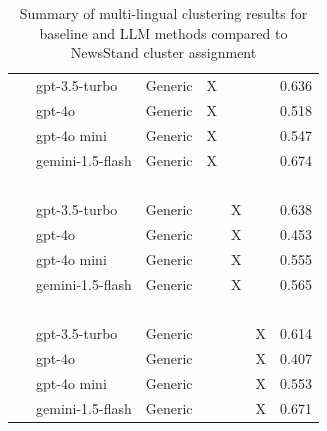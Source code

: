 \begin{table}[ht!]
\begin{tabular}{l|l|cccc|r}
        ~                     & gpt-3.5-turbo     & Generic               & X              & ~                  & ~                    & 0.636 \\
        ~                     & gpt-4o            & Generic               & X              & ~                  & ~                    & 0.518 \\
        ~                     & gpt-4o mini       & Generic               & X              & ~                  & ~                    & 0.547 \\
        ~                     & gemini-1.5-flash  & Generic               & X              & ~                  & ~                    & 0.674 \\
        ~                     & ~                 & ~                      & ~              & ~                  & ~                    & ~   \\
        ~                     & gpt-3.5-turbo     & Generic               & ~              & X                  & ~                    & 0.638 \\
        ~                     & gpt-4o            & Generic               & ~              & X                  & ~                    & 0.453 \\
        ~                     & gpt-4o mini       & Generic               & ~              & X                  & ~                    & 0.555 \\
        ~                     & gemini-1.5-flash  & Generic               & ~              & X                  & ~                    & 0.565 \\
        ~                     & ~                 & ~                      & ~              & ~                  & ~                    & ~   \\
        ~                     & gpt-3.5-turbo     & Generic               & ~              & ~                  & X                    & 0.614 \\
        ~                     & gpt-4o            & Generic               & ~              & ~                  & X                    & 0.407 \\
        ~                     & gpt-4o mini       & Generic               & ~              & ~                  & X                    & 0.553 \\
        ~                     & gemini-1.5-flash  & Generic               & ~              & ~                  & X                    & 0.671 \\

    \end{tabular}
    \caption{Summary of multi-lingual clustering results for baseline and LLM methods compared to NewsStand cluster assignment}
    \label{tab:multi-lang-results}
\end{table}




